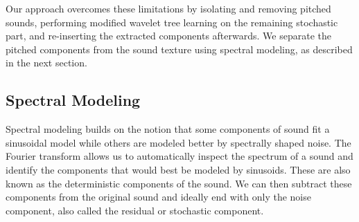 \documentclass{acmsiggraph}               %
\begin{document}
Our approach overcomes these limitations by isolating and removing 
pitched sounds, performing modified wavelet tree learning on the  
remaining stochastic part, and re-inserting the extracted components 
afterwards.  We separate the pitched components from the sound texture 
using spectral modeling, as described in the next section.




\subsection{Spectral Modeling}

Spectral modeling builds on the notion that some components of sound fit a sinusoidal model 
while others are modeled better by spectrally shaped noise. The Fourier transform allows us to 
automatically inspect the spectrum of a sound and identify the components that would best be modeled by sinusoids. These are also known as the deterministic components of the sound. We can then 
subtract these components from the original sound and ideally end with only the noise 
component, also called the residual or stochastic component. 
\end{document}
